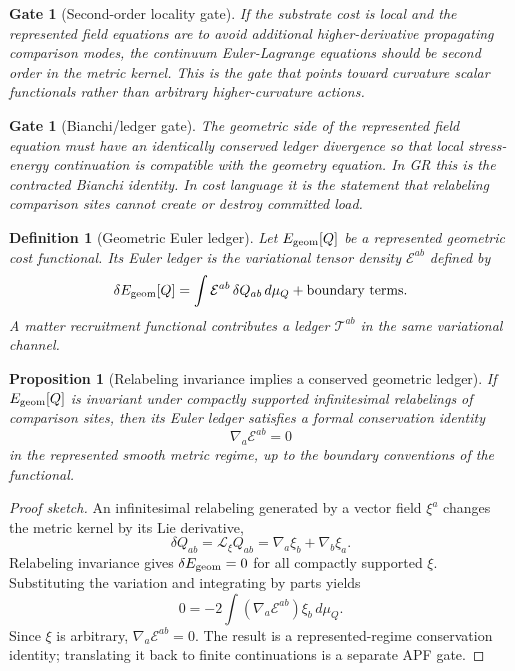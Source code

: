 \documentclass[11pt]{article}
\newtheorem{proposition}[theorem]{Proposition}
\newtheorem{definition}[theorem]{Definition}
\newtheorem{gate}[theorem]{Gate}
\theoremstyle{remark}
\newcommand{\Egeom}{E_{\rm geom}}
\newcommand{\Lie}{\mathcal L}
\begin{document}
\begin{gate}[Second-order locality gate]
If the substrate cost is local and the represented field equations are to avoid additional higher-derivative propagating comparison modes, the continuum Euler-Lagrange equations should be second order in the metric kernel.  This is the gate that points toward curvature scalar functionals rather than arbitrary higher-curvature actions.
\end{gate}

\begin{gate}[Bianchi/ledger gate]
The geometric side of the represented field equation must have an identically conserved ledger divergence so that local stress-energy continuation is compatible with the geometry equation.  In GR this is the contracted Bianchi identity.  In cost language it is the statement that relabeling comparison sites cannot create or destroy committed load.
\end{gate}


\begin{definition}[Geometric Euler ledger]
Let \(\Egeom[Q]\) be a represented geometric cost functional.  Its Euler ledger is the variational tensor density \(\mathcal E^{ab}\) defined by
\[
        \delta \Egeom[Q]
        =\int \mathcal E^{ab}\,\delta Q_{ab}\,d\mu_Q
        +\text{boundary terms}.
\]
A matter recruitment functional contributes a ledger \(\mathcal T^{ab}\) in the same variational channel.
\end{definition}

\begin{proposition}[Relabeling invariance implies a conserved geometric ledger]
\label{prop:ledger-identity}
If \(\Egeom[Q]\) is invariant under compactly supported infinitesimal relabelings of comparison sites, then its Euler ledger satisfies a formal conservation identity
\[
        \nabla_a\mathcal E^{ab}=0
\]
in the represented smooth metric regime, up to the boundary conventions of the functional.
\end{proposition}

\begin{proof}[Proof sketch]
An infinitesimal relabeling generated by a vector field \(\xi^a\) changes the metric kernel by its Lie derivative,
\[
        \delta Q_{ab}=\Lie_\xi Q_{ab}=\nabla_a\xi_b+\nabla_b\xi_a.
\]
Relabeling invariance gives \(\delta\Egeom=0\) for all compactly supported \(\xi\).  Substituting the variation and integrating by parts yields
\[
        0=-2\int (\nabla_a\mathcal E^{ab})\xi_b\,d\mu_Q.
\]
Since \(\xi\) is arbitrary, \(\nabla_a\mathcal E^{ab}=0\).  The result is a represented-regime conservation identity; translating it back to finite continuations is a separate APF gate.
\end{proof}
\end{document}
